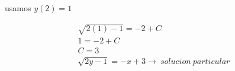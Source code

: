 \documentclass{article}
\begin{document}
usamos $y(2) = 1 $ 

\begin{eqnarray}
\nonumber \sqrt{2(1)-1} = -2 + C \\
\nonumber 1 = -2 + C \\
\nonumber C = 3 \\
\nonumber \sqrt{2y-1} = -x + 3 \rightarrow \ solucion \ particular
\end{eqnarray}
\end{document}
